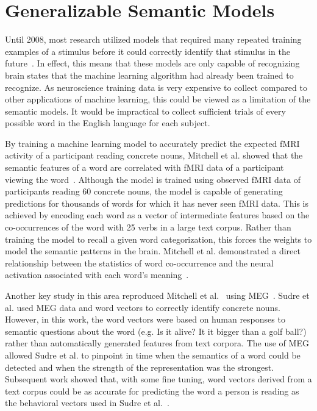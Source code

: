 \section{Generalizable Semantic Models}

Until 2008, most research utilized models that required many repeated training 
examples of a stimulus before it could correctly identify that stimulus in the 
future~\cite{kutas1980reading,kuperberg2007neural,Wang2002,Mitchell2002,Shinkareva2008,Gu2014}.
In effect, this means that these models are only capable of recognizing brain 
states that the machine learning algorithm had already been trained to 
recognize. As neuroscience training data is very expensive to collect compared 
to other applications of machine learning, this could be viewed as a limitation 
of the semantic models. It would be impractical to collect sufficient trials of 
every possible word in the English language for each subject.

By training a machine learning model to accurately predict the expected fMRI 
activity of a participant reading concrete nouns, Mitchell et al. showed that 
the semantic features of a word are correlated with fMRI data of a participant 
viewing the word~\cite{Mitchell2008}. Although the model is trained using 
observed fMRI data of participants reading 60 concrete nouns, the model is 
capable of generating predictions for thousands of words for which it has never 
seen fMRI data. This is achieved by encoding each word as a vector of 
intermediate features based on the co-occurrences of the word with 25 verbs in 
a large text corpus. Rather than training the model to recall a given word 
categorization, this forces the weights to model the semantic patterns in the 
brain. Mitchell et al. demonstrated a direct relationship between the 
statistics of word co-occurrence and the neural activation associated with each 
word's meaning~\cite{Mitchell2008}.

Another key study in this area reproduced Mitchell et al.~\cite{Mitchell2008} 
using MEG~\cite{Sudre2012}. Sudre et al. used MEG data and word vectors to 
correctly identify concrete nouns. However, in this work, the  word vectors 
were based on human responses to semantic questions about the word (e.g. Is it 
alive?  It it bigger than a golf ball?) rather than automatically generated 
features from text corpora. The use of MEG allowed Sudre et al. to pinpoint in 
time when the semantics of a word could be detected and when the strength of 
the representation was the strongest. Subsequent work showed that, with some 
fine tuning, word vectors derived from a text corpus could be as accurate for 
predicting the word a person is reading as the behavioral vectors used in Sudre 
et al.~\cite{Murphy2012}.

